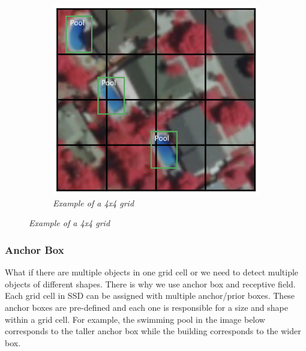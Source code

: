 \begin{figure}[H]
    \centering
    \begin{subfigure}[b]{0.5\textwidth}
        \centering
        \includegraphics[width=\textwidth]{Figures/2. Related Work/ssd_2.png}
        \caption{\textit{
                Example of a 4x4 grid
            } \cite{ssd_1}}
    \end{subfigure}
\end{figure}

\subsubsection{Anchor Box}
What if there are multiple objects in one grid cell or we need to detect
multiple objects of different shapes. There is why we use anchor box and
receptive field.\\

Each grid cell in SSD can be assigned with multiple anchor/prior boxes. These
anchor boxes are pre-defined and each one is responsible for a size and shape
within a grid cell. For example, the swimming pool in the image below
corresponds to the taller anchor box while the building corresponds to the wider
box.

